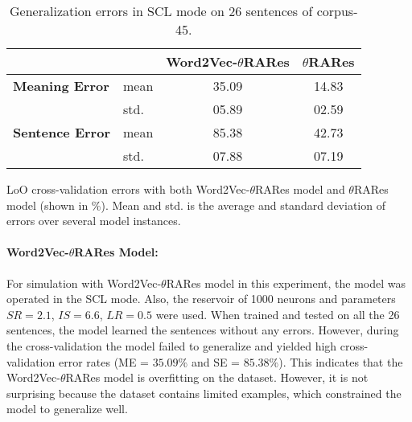 \begin{table}[htbp]
\centering
\begin{threeparttable}
\caption[Cross-Validation errors with Word2Vec-$\theta$RARes on limited number of sentences.]{Generalization errors in SCL mode on 26 sentences of corpus-45.}
\label{tab:corpus_45_errors}
\begin{tabular}{llcc}
\toprule
                           &              &  Word2Vec-$\theta$RARes     & $\theta$RARes \\
\midrule                 
\textbf{Meaning Error}    & mean         & 35.09                      & 14.83  \\
                        & std.         & 05.89                     & 02.59  \\
\textbf{Sentence Error}    & mean         & 85.38                      & 42.73 \\
                        & std.         & 07.88                     & 07.19 \\
\bottomrule
\end{tabular}
\begin{tablenotes}
\small
\item 
LoO cross-validation errors with both Word2Vec-$\theta$RARes model and $\theta$RARes model (shown in \%). Mean and std. is the average and standard deviation of errors over several model instances.
\end{tablenotes}
\end{threeparttable}
\end{table}

\paragraph{Word2Vec-$\theta$RARes Model:} For simulation with Word2Vec-$\theta$RARes model in this experiment, the model was operated in the SCL mode. Also, the reservoir of 1000 neurons and parameters $SR = 2.1$, $IS = 6.6$, $LR = 0.5$ were used. When trained and tested on all the 26 sentences, the model learned the sentences without any errors. However, during the cross-validation the model failed to generalize and yielded high cross-validation error rates (ME = $35.09\%$ and SE = $85.38\%$). This indicates that the Word2Vec-$\theta$RARes model is overfitting on the dataset. However, it is not surprising because the dataset contains limited examples, which constrained the model to generalize well. 

